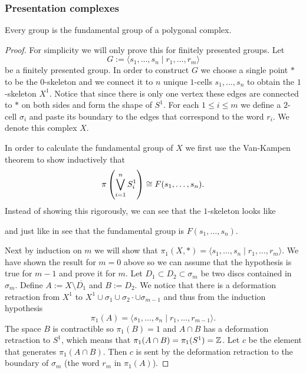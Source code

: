 \documentclass[11pt,a4paper]{article}
\begin{document}
\subsubsection{Presentation complexes}
\begin{theorem}
  Every group is the fundamental group of a polygonal complex.
\end{theorem}
\begin{proof}
  For simplicity we will only prove this for finitely presented groups.
  Let
  \[
    G := \langle s_1,\dots,s_n \mid r_1,\dots,r_m \rangle
  \]
  be a finitely presented group.
  In order to construct $G$ we choose a single point $*$ to be the
  $0$-skeleton and we connect it to $n$ unique $1$-cells $s_1,\dots,s_n$
  to obtain the $1$-skeleton $X^1$.
  Notice that since there is only one vertex these edges are connected to
  $*$ on both sides and form the shape of $S^1$.
  For each $1 \le i \le m$ we define a $2$-cell $\sigma_i$
  and paste its boundary to the edges that correspond to the word $r_i$.
  We denote this complex $X$.

  In order to calculate the fundamental group of $X$ we first
  use the Van-Kampen theorem to show inductively that
  \[
    \pi\del{\bigvee_{i=1}^{n} S^1_i} \cong F(s_1,\dots,s_n).
  \]
  Instead of showing this rigorously, we can see that
  the $1$-skeleton looks like
  \begin{center}
  \end{center}
  and just like in  see that the fundamental
  group is $F(s_1,\dots,s_n)$.

  Next by induction on $m$ we will show that
  $\pi_1(X,*) = \langle s_1,\dots,s_n \mid r_1,\dots,r_m \rangle$.
  We have shown the result for $m = 0$ above so we can assume that
  the hypothesis is true for $m - 1$ and prove it for $m$.
  Let $D_1 \subset D_2 \subset \sigma_m$ be two discs contained in $\sigma_m$.
  Define $A := X \setminus \overline{D_1}$ and $B := D_2$.
  We notice that there is a deformation retraction from $X^1$
  to $X^1 \cup \sigma_1 \cup \sigma_2 \cdot \cup \sigma_{m-1}$
  and thus from the induction hypothesis
  \[
    \pi_1(A) = \langle s_1,\dots,s_n \mid r_1,\dots,r_{m-1} \rangle.
  \]
  The space $B$ is contractible so $\pi_1(B) = 1$ and
  $A \cap B$ has a deformation retraction to $S^1$,
  which means that $\pi_1(A \cap B) = \pi_1(S^1) = \mathbb{Z}$.
  Let $c$ be the element that generates $\pi_1(A \cap B)$.
  Then $c$ is sent by the deformation retraction to the boundary
  of $\sigma_m$ (the word $r_m$ in $\pi_1(A)$).


\end{proof}
\end{document}
